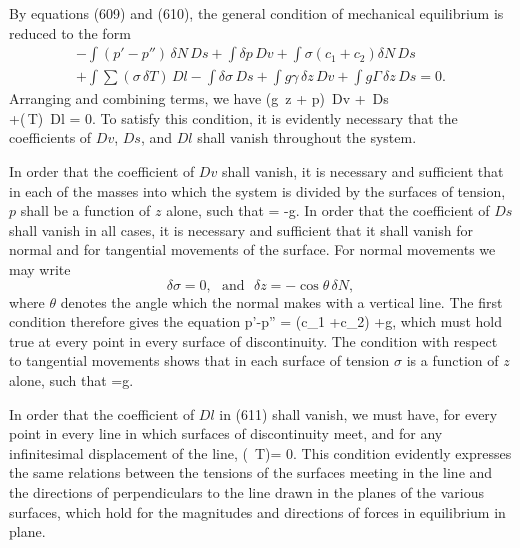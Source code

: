 \documentclass[12pt]{article}
\newcommand{\dd}{\delta}
\begin{document}
By equations (609) and (610), the general condition of mechanical
equilibrium is reduced to the form
\begin{equation*}\begin{aligned}- \int (p'-p'') \, \dd N \, Ds +\int \dd p \, Dv +\int \sigma (c_1 +c_2) \dd N \, Ds \\
+\int \sum (\sigma\, \dd T)\, Dl- \int \dd \sigma \, Ds+\int g\gamma\, \dd z \,Dv +\int g\Gamma\, \dd z \, Ds = 0.\end{aligned}\end{equation*}
Arranging and combining terms, we have
\eqs \int (g\gamma \, \dd z + \dd p) \,Dv +\int [(p'' -p') \dd N + \sigma (c_1 + c_2) \, \dd N+g \Gamma \, \dd z - \dd \sigma] \, Ds\\
+\int \sum (\sigma \,\dd T)\, Dl = 0. \label{611} \eqe 
To satisfy this condition, it is evidently necessary that the coefficients of $Dv$, $Ds$, and $Dl$ shall vanish throughout the system.

In order that the coefficient of $Dv$ shall vanish, it is necessary and sufficient that in each of the masses into which the system is divided by the surfaces of tension, $p$ shall be a function of $z$ alone, such that
\eqs {} =  -g\gamma.  \label{612} \eqe 
In order that the coefficient of $Ds$ shall vanish in all cases, it is necessary and sufficient that it shall vanish for normal and for tangential movements of the surface. For normal movements we may write
$$ \dd \sigma = 0, \ \ \ \text{and} \ \ \ \dd z=-\cos \theta \, \dd N,$$
where $\theta$ denotes the angle which the normal makes with a vertical line. The first condition therefore gives the equation
\eqs p'-p'' = \sigma(c_1 +c_2) +g\Gamma  \cos \theta ,   \label{613} \eqe 
which must hold true at every point in every surface of discontinuity. The condition with respect to tangential movements shows that in each surface of tension $\sigma$ is a function of $z$ alone, such that
\eqs {}=g\Gamma.         \label{614} \eqe 

In order that the coefficient of $Dl$ in (611) shall vanish, we must have, for every point in every line in which surfaces of discontinuity meet, and for any infinitesimal displacement of the line,
\eqs \sum (\sigma \, \dd T)= 0.    \label{615} \eqe 
This condition evidently expresses the same relations between the tensions of the surfaces meeting in the line and the directions of perpendiculars to the line drawn in the planes of the various surfaces, which hold for the magnitudes and directions of forces in equilibrium in plane.
\end{document}
